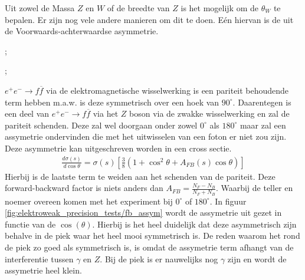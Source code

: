 \documentclass[../main.tex]{subfiles}
\begin{document}
Uit zowel de Massa $Z$ en $W$ of de breedte van $Z$ is het mogelijk om de $\theta_W$ te bepalen. Er zijn nog vele andere manieren om dit te doen. Eén hiervan is de uit de Voorwaards-achterwaardse asymmetrie.\\
\begin{minipage}[c]{0.5\textwidth}
    \begin{center}
        ;
    \end{center}
\end{minipage}\noindent
\begin{minipage}[c]{0.5\textwidth}
    \begin{center}
        ;
    \end{center}
\end{minipage}
$e^+e^-\rightarrow f\overline f$ via de elektromagnetische wisselwerking is een pariteit behoudende term hebben m.a.w. is deze symmetrisch over een hoek van $90^\circ$. Daarentegen is een deel van $e^+e^-\rightarrow f\overline f$ via het $Z$ boson via de zwakke wisselwerking en zal de pariteit schenden. Deze zal wel doorgaan onder zowel $0^\circ$ als $180^\circ$ maar zal een assymetrie ondervinden die met het uitwisselen van een foton er niet zou zijn. Deze asymmetrie kan uitgeschreven worden in een cross sectie.
\begin{equation}
    \begin{aligned}
        \label{eq:fb_assym}
        \frac{d\sigma(s)}{d\cos\theta} = \sigma(s) \left[ \frac{3}{8} (1+\cos^2\theta + A_{FB}(s) \cos\theta) \right]
    \end{aligned}
\end{equation}
Hierbij is de laatste term te weiden aan het schenden van de pariteit. Deze forward-backward factor is niets anders dan $A_{FB} = \frac{N_F-N_B}{N_F+N_B}$. Waarbij de teller en noemer overeen komen met het experiment bij $0^\circ$ of $180^\circ$. In figuur \ref{fig:elektroweak_precision_tests/fb_assym} wordt de assymetrie uit gezet in functie van de $\cos(\theta)$. Hierbij is het heel duidelijk dat deze asymmetrisch zijn behalve in de piek waar het heel mooi symmetrisch is. De reden waarom het rond de piek zo goed als symmetrisch is, is omdat de assymetrie term afhangt van de interferentie tussen $\gamma$ en $Z$. Bij de piek is er nauwelijks nog $\gamma$ zijn en wordt de assymetrie heel klein.
\end{document}
